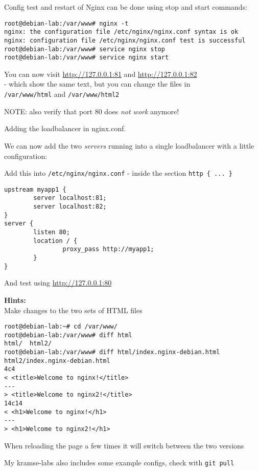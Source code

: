 \documentclass[a4paper,11pt,notitlepage]{report}
\begin{document}
Config test and restart of Nginx can be done using stop and start commands:

\begin{verbatim}
root@debian-lab:/var/www# nginx -t
nginx: the configuration file /etc/nginx/nginx.conf syntax is ok
nginx: configuration file /etc/nginx/nginx.conf test is successful
root@debian-lab:/var/www# service nginx stop
root@debian-lab:/var/www# service nginx start
\end{verbatim}

You can now visit \url{http://127.0.0.1:81} and \url{http://127.0.0.1:82}\\
 - which show the same text, but you can change the files in \\
 \verb+/var/www/html+ and \verb+/var/www/html2+

NOTE: also verify that port 80 does \emph{not work} anymore!

Adding the loadbalancer in nginx.conf.

We can now add the two \emph{servers} running into a single loadbalancer with a little configuration:

Add this into \verb+/etc/nginx/nginx.conf+ - inside the section \verb+http { ... }+
\begin{verbatim}
upstream myapp1 {
        server localhost:81;
        server localhost:82;
}
server {
        listen 80;
        location / {
                proxy_pass http://myapp1;
        }
}
\end{verbatim}

And test using \url{http://127.0.0.1:80}



{\bf Hints:}\\
Make changes to the two sets of HTML files

\begin{verbatim}
root@debian-lab:~# cd /var/www/
root@debian-lab:/var/www# diff html
html/  html2/
root@debian-lab:/var/www# diff html/index.nginx-debian.html html2/index.nginx-debian.html
4c4
< <title>Welcome to nginx!</title>
---
> <title>Welcome to nginx2!</title>
14c14
< <h1>Welcome to nginx!</h1>
---
> <h1>Welcome to nginx2!</h1>
\end{verbatim}

When reloading the page a few times it will switch between the two versions

My kramse-labs also includes some example configs, check with \verb+git pull+
\end{document}
